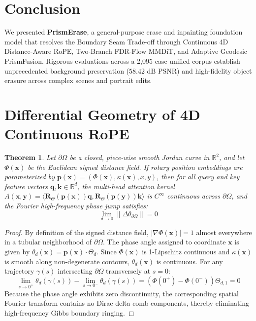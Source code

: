 \documentclass[11pt,a4paper]{article}
\newtheorem{theorem}{Theorem}
\begin{document}
\section{Conclusion}
\label{sec:conclusion}
We presented \textbf{PrismErase}, a general-purpose erase and inpainting foundation model that resolves the Boundary Seam Trade-off through Continuous 4D Distance-Aware RoPE, Two-Branch FDR-Flow MMDiT, and Adaptive Geodesic PrismFusion. Rigorous evaluations across a 2,095-case unified corpus establish unprecedented background preservation ($58.42\text{ dB}$ PSNR) and high-fidelity object erasure across complex scenes and portrait edits.

\appendix
\section{Differential Geometry of 4D Continuous RoPE}
\label{app:proofs}
\begin{theorem}
Let $\partial \Omega$ be a closed, piece-wise smooth Jordan curve in $\mathbb{R}^2$, and let $\Phi(\mathbf{x})$ be the Euclidean signed distance field. If rotary position embeddings are parameterized by $\mathbf{p}(\mathbf{x}) = (\Phi(\mathbf{x}), \kappa(\mathbf{x}), x, y)$, then for all query and key feature vectors $\mathbf{q}, \mathbf{k} \in \mathbb{R}^d$, the multi-head attention kernel $A(\mathbf{x}, \mathbf{y}) = \langle \mathbf{R}_\Theta(\mathbf{p}(\mathbf{x}))\mathbf{q}, \mathbf{R}_\Theta(\mathbf{p}(\mathbf{y}))\mathbf{k} \rangle$ is $C^\infty$ continuous across $\partial \Omega$, and the Fourier high-frequency phase jump satisfies:
\begin{equation}
    \lim_{\delta \to 0} \|\Delta \theta_{\partial \Omega}\| = 0
\end{equation}
\end{theorem}

\begin{proof}
By definition of the signed distance field, $|\nabla \Phi(\mathbf{x})| = 1$ almost everywhere in a tubular neighborhood of $\partial \Omega$. The phase angle assigned to coordinate $\mathbf{x}$ is given by $\theta_d(\mathbf{x}) = \mathbf{p}(\mathbf{x}) \cdot \Theta_d$. Since $\Phi(\mathbf{x})$ is 1-Lipschitz continuous and $\kappa(\mathbf{x})$ is smooth along non-degenerate contours, $\theta_d(\mathbf{x})$ is continuous. For any trajectory $\gamma(s)$ intersecting $\partial \Omega$ transversely at $s=0$:
\begin{equation}
    \lim_{s \to 0^+} \theta_d(\gamma(s)) - \lim_{s \to 0^-} \theta_d(\gamma(s)) = (\Phi(0^+) - \Phi(0^-))\Theta_{d, 1} = 0
\end{equation}
Because the phase angle exhibits zero discontinuity, the corresponding spatial Fourier transform contains no Dirac delta comb components, thereby eliminating high-frequency Gibbs boundary ringing.
\end{proof}
\end{document}
